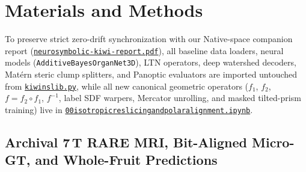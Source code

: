 \documentclass[10pt,a4paper]{article}
\renewcommand{\_}{\origunderscore\allowbreak}
\newcommand{\ghblob}{https://github.com/arvidl/BMED365-2027/blob/main}
\newcommand{\repodir}{Lab4-Comp-Imag/Kiwi-challenge/docs/neurosymbolic-report}
\newcommand{\nbref}[1]{\href{\ghblob/\repodir/notebooks/#1}{\texttt{#1}}}
\newcommand{\natrep}{\href{\ghblob/\repodir/neurosymbolic-kiwi-report.pdf}{\texttt{neurosymbolic-\allowbreak kiwi-\allowbreak report.pdf}}}
\begin{document}
\clearpage
\section{Materials and Methods}
\label{sec:methods}

To preserve strict zero-drift synchronization with our Native-space companion report (\natrep{}), all baseline data loaders, neural models (\texttt{AdditiveBayesOrganNet3D}), LTN operators, deep watershed decoders, Mat\'ern steric clump splitters, and Panoptic evaluators are imported untouched from \nbref{kiwi\_ns\_lib.py}, while all new canonical geometric operators ($f_1$, $f_2$, $f = f_2 \circ f_1$, $f^{-1}$, label SDF warpers, Mercator unrolling, and masked tilted-prism training) live in \nbref{00\_isotropic\_reslicing\_and\_polar\_alignment.ipynb}.

\subsection{Archival 7\,T RARE MRI, Bit-Aligned Micro-GT, and Whole-Fruit Predictions}
\label{sec:meth_data}
\end{document}
